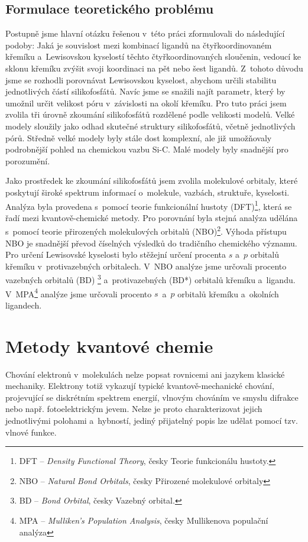 \documentclass[
digital, %
table,   %
nolof,     %
nolot,     %
oneside,
]{fithesis3}
\begin{document}
\section{Formulace teoretického problému}
Postupně jsme hlavní otázku řešenou v~této práci zformulovali do následující podoby: Jaká je souvislost mezi kombinací ligandů na čtyřkoordinovaném křemíku a~Lewisovskou kyselostí těchto čtyřkoordinovaných sloučenin, vedoucí ke sklonu křemíku zvýšit svoji koordinaci na pět nebo šest ligandů.
Z~tohoto důvodu jsme se rozhodli porovnávat Lewisovskou kyselost, abychom určili stabilitu jednotlivých částí silikofosfátů. Navíc jsme se snažili najít parametr, který by umožnil určit velikost póru v~závislosti na okolí křemíku. Pro tuto práci jsem zvolila tři úrovně zkoumání silikofosfátů rozdělené podle velikosti modelů. Velké modely sloužily jako odhad skutečné struktury silikofosfátů, včetně jednotlivých pórů. Středně velké modely byly stále dost komplexní, ale již umožňovaly podrobnější pohled na chemickou vazbu Si-C. Malé modely byly snadnější pro porozumění.

Jako prostředek ke zkoumání silikofosfátů jsem zvolila molekulové orbitaly, které poskytují široké spektrum informací o~molekule, vazbách, struktuře, kyselosti.  Analýza byla provedena s~pomocí teorie funkcionální hustoty (DFT)\footnote{DFT -- \textit{Density Functional Theory}, česky Teorie funkcionálu hustoty.}, která se řadí mezi kvantově-chemické metody. Pro porovnání byla stejná analýza udělána s~pomocí teorie přirozených molekulových orbitalů (NBO)\footnote{NBO -- \textit{Natural Bond Orbitals}, česky Přirozené molekulové orbitaly}. Výhoda přístupu NBO je snadnější převod číselných výsledků do tradičního chemického významu. Pro určení Lewisovské kyselosti bylo stěžejní určení procenta $s$ a~$p$ orbitalů křemíku v~protivazebných orbitalech.  V~NBO analýze jsme určovali procento vazebných orbitalů (BD) \footnote{BD -- \textit{Bond Orbital}, česky Vazebný orbital.} a~protivazebných (BD*) orbitalů křemíku a~ligandu. V~MPA\footnote{MPA -- \textit{Mulliken's Population Analysis}, česky Mullikenova populační analýza} analýze jsme určovali procento $s$~a~$p$ orbitalů křemíku a~okolních ligandech.
\newpage

\chapter{Metody kvantové chemie}
Chování elektronů v~molekulách nelze popsat rovnicemi ani jazykem klasické mechaniky. Elektrony totiž vykazují typické kvantově-mechanické chování, projevující se diskrétním spektrem energií, vlnovým chováním ve smyslu difrakce nebo např. fotoelektrickým jevem. Nelze je proto charakterizovat jejich jednotlivými polohami a~hybností, jediný přijatelný popis lze udělat pomocí tzv. vlnové funkce.
\end{document}
